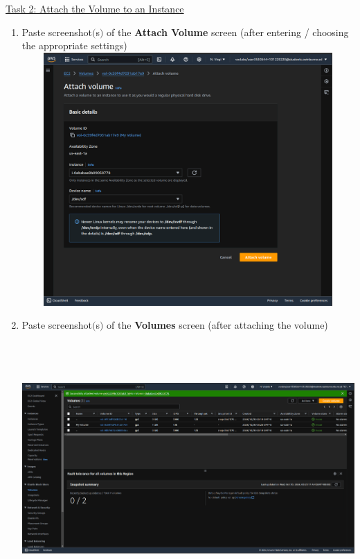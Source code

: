 \documentclass[11pt]{article}
\begin{document}
\noindent\underline{Task 2: Attach the Volume to an Instance}
\begin{enumerate}[resume]
    \item Paste screenshot$($s$)$ of the \textbf{Attach Volume} screen  (after entering / choosing the appropriate settings) \\

    {\centering
    \includegraphics[width=6.1in, height=3.8in]{pics/4.png}
    }


    \item Paste screenshot$($s$)$ of the \textbf{Volumes} screen (after attaching the volume) \\
    \vspace{5mm}

    {\centering
    \includegraphics[width=6.1in, height=3.8in]{pics/5.png}
    }

\end{enumerate}
\end{document}
